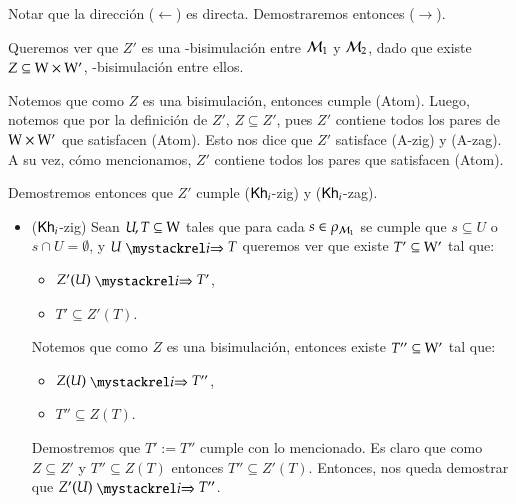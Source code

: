 \begin{demostracion}

    Notar que la dirección ($\leftarrow$) es directa. Demostraremos entonces ($\rightarrow$).

    Queremos ver que $Z'$ es una \KHilogic-bisimulación entre $\mathcal{M}_1$ y $\mathcal{M}_2$,
    dado que existe $Z \subseteq \mathrm{W} \times \mathrm{W}'$, \KHilogic-bisimulación entre ellos.

    Notemos que como $Z$ es una bisimulación, entonces cumple (Atom). Luego, notemos que
    por la definición de $Z'$, $Z \subseteq Z'$, pues $Z'$ contiene todos los pares de
    $\mathrm{W} \times \mathrm{W}'$ que satisfacen (Atom). Esto nos dice que $Z'$ satisface (A-zig) y (A-zag).
    A su vez, cómo mencionamos, $Z'$ contiene todos los pares que satisfacen (Atom).

    Demostremos entonces que $Z'$ cumple ($\mathsf{Kh}_i$-zig) y ($\mathsf{Kh}_i$-zag).

    \begin{itemize}
        \item ($\mathsf{Kh}_i$-zig) Sean $U,T \subseteq \mathrm{W}$ tales que para cada $s \in \rho_{\mathcal{M}_1}$ se cumple que $s \subseteq U$ 
        o $s \cap U = \emptyset$, y $U \ultsExecAgi T$ queremos ver que existe $T' \subseteq \mathrm{W}'$ tal que:
    
        \begin{multicols}{2}
            \begin{itemize}
                \item $Z'(U) \ultsExecAgi T'$, 
                \item $T' \subseteq Z'(T)$.
            \end{itemize}
        \end{multicols}
    
        Notemos que como $Z$ es una bisimulación, entonces existe $T'' \subseteq \mathrm{W}'$ tal que:
    
        \begin{multicols}{2}
            \begin{itemize}
                \item $Z(U) \ultsExecAgi T''$, 
                \item $T'' \subseteq Z(T)$.
            \end{itemize}
        \end{multicols}
    
        Demostremos que $T' := T''$ cumple con lo mencionado. Es claro que como $Z \subseteq Z'$ y 
        $T'' \subseteq Z(T)$ entonces $T'' \subseteq Z'(T)$. Entonces, nos queda demostrar que $Z'(U) \ultsExecAgi T''$.
    

\end{itemize}
\end{demostracion}
